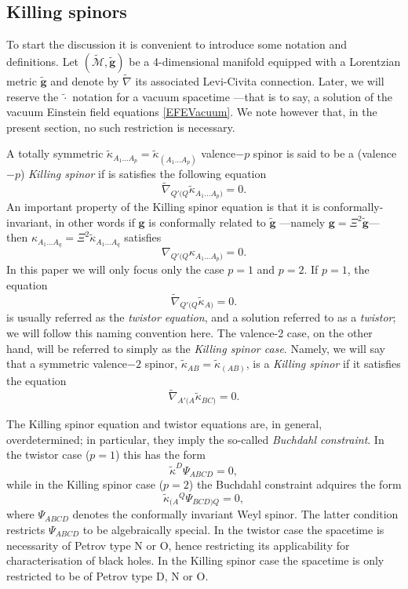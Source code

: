 \documentclass[10pt,a4paper]{article}
\theoremstyle{plain}
\def\bmg{{\bm g}}
\begin{document}
\subsection{Killing spinors}\label{Sec:KillingSpinors}

To start the discussion it is convenient to introduce some notation
and definitions. Let $(\tilde{\mathcal{M}},\tilde{\bmg})$ be a
4-dimensional manifold equipped with a Lorentzian metric
$\tilde{\bmg}$ and denote by $\tilde{\nabla}$ its associated
Levi-Civita connection.  Later, we will reserve the $\tilde{\cdot}$
notation for a vacuum spacetime ---that is to say, a solution of the
vacuum Einstein field equations \eqref{EFEVacuum}. We note however
that, in the present section, no such restriction is necessary.

\medskip

A totally symmetric
$\tilde{\kappa}_{A_1...A_p}=\tilde{\kappa}_{(A_1...A_p)}$ valence$-p$
spinor is said to be a (valence$-p$) \emph{Killing spinor} if is
satisfies the following equation
\begin{equation}\label{qValenceKillingspinor}
\tilde{\nabla}_{Q'(Q}\tilde{\kappa}_{A_1...A_p)}=0.
\end{equation}
An important property of the Killing spinor equation is that it is
conformally-invariant, in other words if $\bmg$ is conformally related
to $\tilde{\bmg}$ ---namely $\bmg=\Xi^2\tilde{\bmg}$--- then
${\kappa}_{A_1...A_q}=\Xi^2 \tilde{\kappa}_{A_1...A_q}$ satisfies
\[{\nabla}_{Q'(Q}{\kappa}_{A_1...A_p)}=0.\]
\medskip
\noindent In this paper we will only focus only the case $p=1$ and
$p=2$.  If $p=1$, the equation
\begin{equation}\label{TwistorEq}
  \tilde{\nabla}_{Q'(Q}\tilde{\kappa}_{A)}=0.
\end{equation}
is usually referred as the \emph{twistor equation}, and a solution
referred to as a \emph{twistor}; we will follow this naming convention
here.  The valence-2 case, on the other hand, will be referred to
simply as the \emph{Killing spinor case}.  Namely, we will say that a
symmetric valence$-2$ spinor,
$\tilde{\kappa}_{AB}=\tilde{\kappa}_{(AB)}$, is a \textit{Killing
  spinor} if it satisfies the equation
\begin{equation}
\tilde{\nabla}_{A'(A}\tilde{\kappa}_{BC)}=0.
\end{equation}

The Killing spinor equation and twistor equations are, in general,
overdetermined; in particular, they imply the so-called
\textit{Buchdahl constraint}.  In the twistor case ($p=1$) this has
the form
\[
\tilde{\kappa}^D\Psi_{ABCD}=0,
\]
while in the Killing spinor case ($p=2$) the Buchdahl constraint
adquires the form
\[
\tilde{\kappa}_{(A}{}^Q\Psi_{BCD)Q}=0,
\]
where $\Psi_{ABCD}$ denotes the conformally invariant Weyl spinor.
The latter condition restricts $\Psi_{ABCD}$ to be algebraically
special.  In the twistor case the spacetime is necessarity of Petrov
type N or O, hence restricting its applicability for characterisation
of black holes.  In the Killing spinor case the spacetime is only
restricted to be of Petrov type D, N or O.
\end{document}
